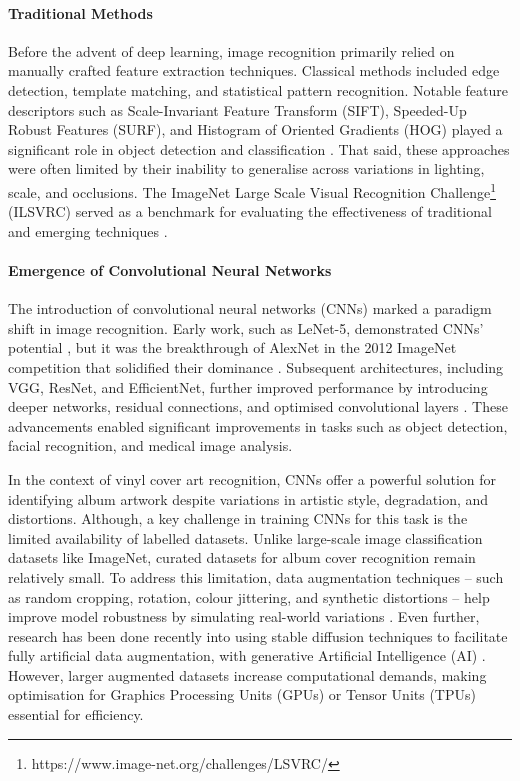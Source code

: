             \paragraph{Traditional Methods}
            
                Before the advent of deep learning, image recognition primarily relied on manually crafted feature extraction techniques. Classical methods included edge detection, template matching, and statistical pattern recognition. Notable feature descriptors such as Scale-Invariant Feature Transform (SIFT), Speeded-Up Robust Features (SURF), and Histogram of Oriented Gradients (HOG) played a significant role in object detection and classification \cite{pal2001pattern}. That said, these approaches were often limited by their inability to generalise across variations in lighting, scale, and occlusions. The ImageNet Large Scale Visual Recognition Challenge\footnote{https://www.image-net.org/challenges/LSVRC/} (ILSVRC) served as a benchmark for evaluating the effectiveness of traditional and emerging techniques \cite{russakovsky2015imagenetlargescalevisual}.
            
            \paragraph{Emergence of Convolutional Neural Networks}
            
                The introduction of convolutional neural networks (CNNs) marked a paradigm shift in image recognition. Early work, such as LeNet-5, demonstrated CNNs' potential \cite{726791}, but it was the breakthrough of AlexNet in the 2012 ImageNet competition that solidified their dominance \cite{imagenetclasscnn}. Subsequent architectures, including VGG, ResNet, and EfficientNet, further improved performance by introducing deeper networks, residual connections, and optimised convolutional layers \cite{deppcnnsforimagerecognition}. These advancements enabled significant improvements in tasks such as object detection, facial recognition, and medical image analysis.
    
                In the context of vinyl cover art recognition, CNNs offer a powerful solution for identifying album artwork despite variations in artistic style, degradation, and distortions. Although, a key challenge in training CNNs for this task is the limited availability of labelled datasets. Unlike large-scale image classification datasets like ImageNet, curated datasets for album cover recognition remain relatively small. To address this limitation, data augmentation techniques -- such as random cropping, rotation, colour jittering, and synthetic distortions -- help improve model robustness by simulating real-world variations \cite{LIN2025102660}. Even further, research has been done recently into using stable diffusion techniques to facilitate fully artificial data augmentation, with generative Artificial Intelligence (AI) \cite{Alimisis2025}. However, larger augmented datasets increase computational demands, making optimisation for Graphics Processing Units (GPUs) or Tensor Units (TPUs) essential for efficiency.
    
